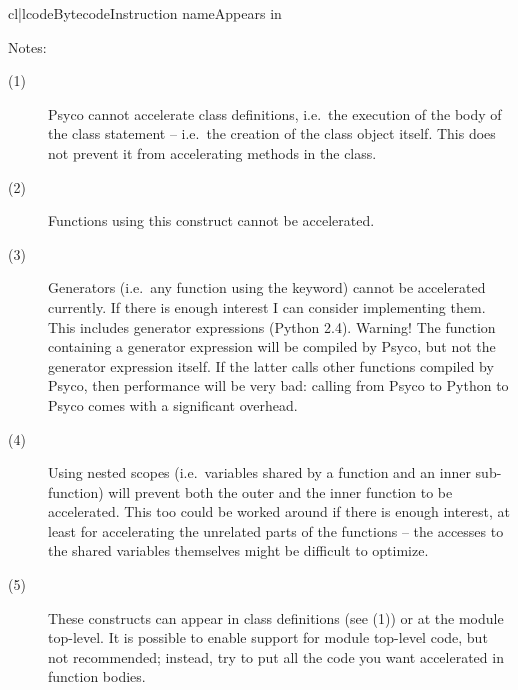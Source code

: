 \documentclass{manual}
\begin{document}
\begin{tableiii}{cl|l}{code}{Bytecode}{Instruction name}{Appears in}
\end{tableiii}

\noindent
Notes:
%
\begin{description}
\item[(1)]
  Psyco cannot accelerate class definitions, i.e.\ the execution of the body of the class statement -- i.e.\ the creation of the class object itself.  This does not prevent it from accelerating methods in the class.
\item[(2)]
  Functions using this construct cannot be accelerated.
\item[(3)]
  Generators (i.e.\ any function using the  keyword) cannot be accelerated currently.  If there is enough interest I can consider implementing them.  This includes generator expressions (Python 2.4).  Warning!  The function containing a generator expression will be compiled by Psyco, but not the generator expression itself.  If the latter calls other functions compiled by Psyco, then performance will be very bad: calling from Psyco to Python to Psyco comes with a significant overhead.
\item[(4)]
  Using nested scopes (i.e.\ variables shared by a function and an inner sub-function) will prevent both the outer and the inner function to be accelerated.  This too could be worked around if there is enough interest, at least for accelerating the unrelated parts of the functions -- the accesses to the shared variables themselves might be difficult to optimize.
\item[(5)]
  These constructs can appear in class definitions (see (1)) or at the module top-level.  It is possible to enable support for module top-level code, but not recommended; instead, try to put all the code you want accelerated in function bodies.
\end{description}
\end{document}
